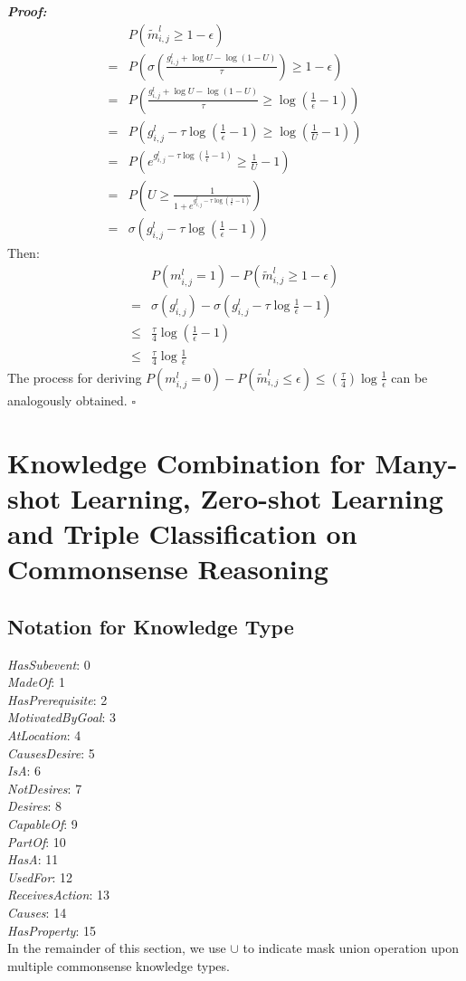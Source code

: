 \documentclass[11pt]{article}
\begin{document}
\noindent
\textit{\textbf{Proof:}}
\begin{align}
	&P(\tilde{m}_{i,j}^l\geq 1-\epsilon) \\
	=&P(\sigma(\frac{g_{i,j}^l+\log{U}-\log{(1-U)}}{\tau}) \geq 1-\epsilon)\\
	=&P(\frac{g_{i,j}^l+\log{U}-\log{(1-U)}}{\tau} \geq \log{(\frac{1}{\epsilon}-1)}) \\
	=&P(g_{i,j}^l-\tau \log{(\frac{1}{\epsilon}-1)}\geq \log{(\frac{1}{U}-1)})\\
	=&P(e^{g_{i,j}^l-\tau \log{(\frac{1}{\epsilon}-1)}} \geq \frac{1}{U}-1)\\
	=&P(U\geq \frac{1}{1+e^{g_{i,j}^l-\tau \log{(\frac{1}{\epsilon}-1)}}})\\
	=&\sigma(g_{i,j}^l-\tau \log{(\frac{1}{\epsilon}-1)})
\end{align}
Then:
\begin{align}
	&P(m_{i,j}^l=1) - P(\tilde{m}_{i,j}^l\geq 1-\epsilon)\\
	=&\sigma(g_{i,j}^l)-\sigma(g_{i,j}^l-\tau \log{\frac{1}{\epsilon}-1})\\
	\leq&\frac{\tau}{4} \log{(\frac{1}{\epsilon}-1)} \\
	\leq&\frac{\tau}{4} \log{\frac{1}{\epsilon}}
\end{align}
The process for deriving $P(m_{i,j}^l=0) - P(\tilde{m}_{i,j}^l\leq \epsilon) \leq (\frac{\tau}{4})\log{\frac{1}{\epsilon}}$ can be analogously obtained.
$\square$

\section{Knowledge Combination for Many-shot Learning, Zero-shot Learning and Triple Classification on Commonsense Reasoning}
\subsection{Notation for Knowledge Type}
\textit{HasSubevent}: 0\\
\textit{MadeOf}: 1\\
\textit{HasPrerequisite}: 2\\
\textit{MotivatedByGoal}: 3\\
\textit{AtLocation}: 4\\
\textit{CausesDesire}: 5\\
\textit{IsA}: 6\\
\textit{NotDesires}: 7\\
\textit{Desires}: 8\\
\textit{CapableOf}: 9\\
\textit{PartOf}: 10\\
\textit{HasA}: 11\\
\textit{UsedFor}: 12\\
\textit{ReceivesAction}: 13\\
\textit{Causes}: 14\\
\textit{HasProperty}: 15\\
In the remainder of this section, we use $\cup$ to indicate mask union operation upon multiple commonsense knowledge types.
\end{document}
